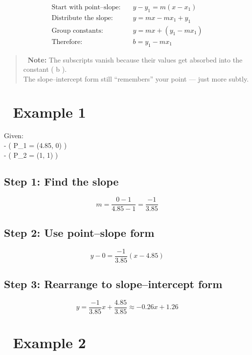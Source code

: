 \documentclass[
  letterpaper,
]{book}
\begin{document}
\[
\begin{align}
\text{Start with point–slope:} \quad & y - y_1 = m(x - x_1) \\[6pt]
\text{Distribute the slope:} \quad & y = mx - mx_1 + y_1 \\[6pt]
\text{Group constants:} \quad & y = mx + (y_1 - mx_1) \\[6pt]
\text{Therefore:} \quad & b = y_1 - mx_1
\end{align}
\]

\begin{quote}
🧠 \textbf{Note:} The subscripts vanish because their values get
absorbed into the constant ( b ).\\
The slope--intercept form still ``remembers'' your point --- just more
subtly.
\end{quote}

\section{🧪 Example 1}\label{example-1}

Given:\\
- ( P\_1 = (4.85, 0) )\\
- ( P\_2 = (1, 1) )

\subsection{Step 1: Find the slope}\label{step-1-find-the-slope}

\[
m = \frac{0 - 1}{4.85 - 1} = \frac{-1}{3.85}
\]

\subsection{Step 2: Use point--slope
form}\label{step-2-use-pointslope-form}

\[
y - 0 = \frac{-1}{3.85}(x - 4.85)
\]

\subsection{Step 3: Rearrange to slope--intercept
form}\label{step-3-rearrange-to-slopeintercept-form}

\[
y = \frac{-1}{3.85}x + \frac{4.85}{3.85} \approx -0.26x + 1.26
\]

\section{🧪 Example 2}\label{example-2}
\end{document}

